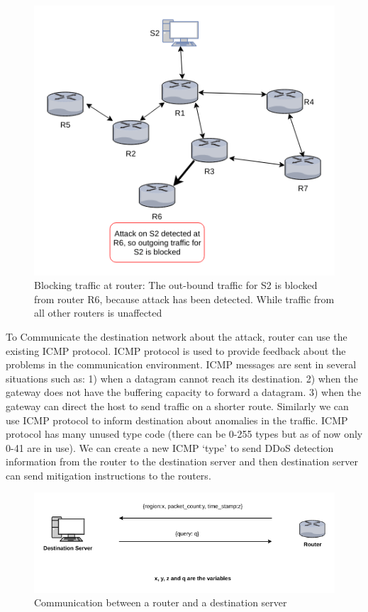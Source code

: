 \documentclass[12pt,oneside,a4paper]{article}
\begin{document}
\begin{figure}[H]
\centering
\includegraphics[scale=0.60]{mitigation_path}
\caption{Blocking traffic at router: The out-bound traffic for S2 is blocked from router R6,
because attack has been detected. While traffic from all other routers is unaffected} \label{fig:mitigation_path}
\end{figure}

To Communicate the destination network about the attack, router can use the existing ICMP protocol. ICMP protocol is used to provide feedback about the problems in the communication environment. ICMP messages are sent in several situations such as: 1) when a datagram cannot reach its destination. 2) when the gateway does not have the buffering capacity to forward a datagram. 3) when the gateway can direct the host to send traffic on a shorter route.\cite{icmp} Similarly we can use ICMP protocol to inform destination about anomalies in the traffic. ICMP protocol has many unused type code (there can be 0-255 types but as of now only 0-41 are in use). We can create a new ICMP `type' to send DDoS detection information from the router to the destination server and then destination server can send mitigation instructions to the routers.

\begin{figure}[H]
\centering
\includegraphics[scale=0.5]{router-network-communication}
\caption{Communication between a router and a destination server} \label{fig:router-network-communication}
\end{figure}
\end{document}
